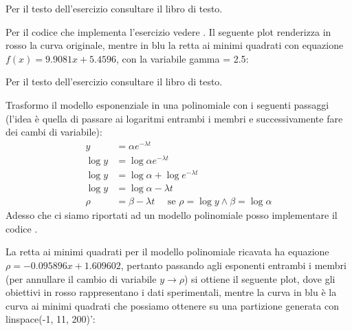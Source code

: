\begin{exercise}[4.21] 
Per il testo dell'esercizio consultare il libro di testo. 
\end{exercise}
Per il codice che implementa l'esercizio vedere .
Il seguente plot renderizza in rosso la curva originale, mentre in blu la retta
ai minimi quadrati con equazione $f(x) = 9.9081x + 5.4596$, con la variabile
\textsf{gamma = 2.5}:
\begin{center}   

\end{center}

\begin{exercise}[4.22] 
Per il testo dell'esercizio consultare il libro di testo. 
\end{exercise}
Trasformo il modello esponenziale in una polinomiale con i seguenti passaggi
(l'idea \`e quella di passare ai logaritmi entrambi i membri e successivamente
fare dei cambi di variabile):
\begin{displaymath}
\begin{split}
y &= \alpha e^{-\lambda t}\\
\log{y} &= \log{\alpha e^{-\lambda t}}\\
\log{y} &= \log{\alpha} +  \log{e^{-\lambda t}}\\
\log{y} &= \log{\alpha} -\lambda t\\
\rho &= \beta -\lambda t \quad \text{ se } \rho = \log{y} \wedge \beta =
\log{\alpha}
\end{split}
\end{displaymath}
Adesso che ci siamo riportati ad un modello polinomiale posso implementare
il codice . 

La retta ai minimi quadrati per il modello polinomiale ricavata ha equazione
$\rho = -0.095896x + 1.609602$, pertanto passando agli esponenti entrambi i
membri (per annullare il cambio di variabile $y \rightarrow \rho$) si ottiene il
seguente plot, dove gli obiettivi in rosso rappresentano i dati sperimentali, 
mentre la curva in blu \`e la curva ai minimi quadrati che possiamo ottenere  su
una partizione generata con \textsf{linspace(-1, 11, 200)'}:
\begin{center}

\end{center}



